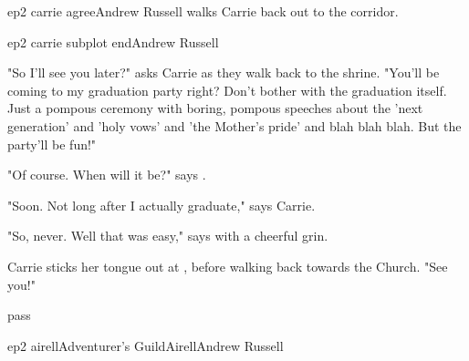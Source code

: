 \documentclass{book}
\begin{document}
\begin{childnode}{ep2 carrie agree}{Andrew Russell}
     \name{} walks Carrie back out to the corridor.






\end{childnode}

\begin{childnode}{ep2 carrie subplot end}{Andrew Russell}


    "So I'll see you later?" asks Carrie as they walk back to the shrine. "You'll be coming to my graduation party right? Don't bother with the graduation itself. Just a pompous ceremony with 
    boring, pompous speeches about the
    'next generation' and 'holy vows' and 'the Mother's pride' and blah blah blah. But the party'll be fun!"

    "Of course. When will it be?" says \name{}.

    "Soon. Not long after I actually graduate," says Carrie.

    "So, never. Well that was easy," says \name{} with a cheerful grin.

    Carrie sticks her tongue out at \name{}, before walking back towards the Church. "See you!"


\end{childnode}

\begin{closeScene}
        pass
\end{closeScene}

\begin{node}{ep2 airell}{Adventurer's Guild}{Airell}{Andrew Russell}




\end{node}
\end{document}
